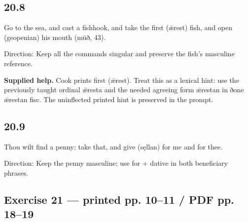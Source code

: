\subsection*{20.8}

\par\begin{minipage}{\linewidth}\raggedright
Go to the sea, and cast a fishhook, and take the first (ǣrest) fish, and open (geopenian) his mouth (mūð, 43).

Direction: Keep all the commands singular and preserve the fish’s masculine reference.

\end{minipage}\par\addvspace{4pt}

\textbf{Supplied help.} Cook prints first (ǣrest). Treat this as a lexical hint: use the previously taught ordinal ǣresta and the needed agreeing form ǣrestan in ðone ǣrestan fisc. The uninflected printed hint is preserved in the prompt.

\subsection*{20.9}

\par\begin{minipage}{\linewidth}\raggedright
Thou wilt find a penny; take that, and give (sęllan) for me and for thee.

Direction: Keep the penny masculine; use for + dative in both beneficiary phrases.

\end{minipage}\par\addvspace{4pt}

\subsection*{Exercise 21 — printed pp. 10–11 /\allowbreak{} PDF pp. 18–19}


